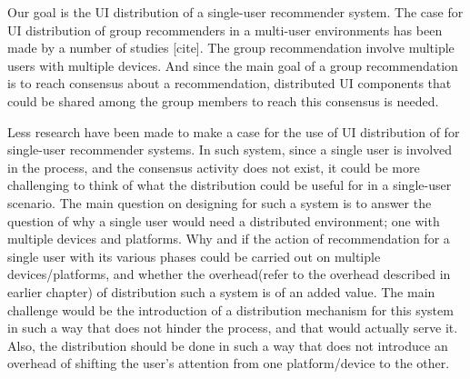 Our goal is the UI distribution of a single-user recommender system. The case for UI distribution of group recommenders in a multi-user environments has been made by a number of studies [cite]. The group recommendation involve multiple users with multiple devices. And since the main goal of a group recommendation is to reach consensus about a recommendation, distributed UI components that could be shared among the group members to reach this consensus is needed.

Less research have been made to make a case for the use of UI distribution of for single-user recommender systems. In such system, since a single user is involved in the process, and the consensus activity does not exist, it could be more challenging to think of what the distribution could be useful for in a single-user scenario. The main question on designing for such a system is to answer the question of why a single user would need a distributed environment; one with multiple devices and platforms. Why and if the action of recommendation for a single user with its various phases could be carried out on multiple devices/platforms, and whether the overhead(refer to the overhead described in earlier chapter) of distribution such a system is of an added value. The main challenge would be the introduction of a distribution mechanism for this system in such a way that does not hinder the process, and that would actually serve it. Also, the distribution should be done in such a way that does not introduce an overhead of shifting the user's attention from one platform/device to the other. 

